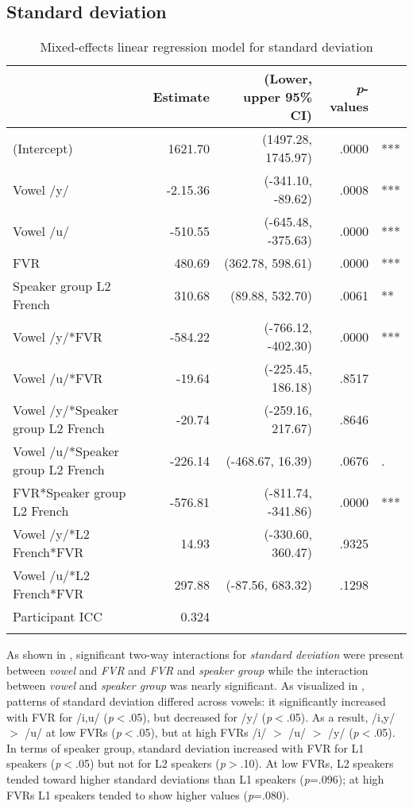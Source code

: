 \documentclass[output=paper,colorlinks,citecolor=brown,draftmode]{langscibook}
\begin{document}
\subsection{Standard deviation}
\begin{table}
\caption{Mixed-effects linear regression model for standard deviation}
\small
\begin{tabularx}{\textwidth}{Qrrrl}
 \lsptoprule
   & \textbf{Estimate} & \textbf{(Lower, upper 95\% CI)} & \textbf{\emph{p}-values} &  \\ [0.5ex]
 \midrule
 (Intercept) & 1621.70 & (1497.28, 1745.97) & .0000 & *** \\
 Vowel /y/ & -2.15.36 & (-341.10, -89.62) & .0008 & *** \\
 Vowel /u/ & -510.55 & (-645.48, -375.63) & .0000 & *** \\
 FVR & 480.69 & (362.78, 598.61) & .0000 & *** \\
 Speaker group L2 French & 310.68 & (89.88, 532.70) & .0061 & ** \\
 Vowel /y/*FVR & -584.22 & (-766.12, -402.30) & .0000 & *** \\
 Vowel /u/*FVR & -19.64 & (-225.45, 186.18) & .8517 & \\
 Vowel /y/*Speaker group L2 French & -20.74 & (-259.16, 217.67) & .8646 & \\
 Vowel /u/*Speaker group L2 French & -226.14 & (-468.67, 16.39) & .0676 & . \\
 FVR*Speaker group L2 French & -576.81 & (-811.74, -341.86) & .0000 & *** \\
 Vowel /y/*L2 French*FVR & 14.93 & (-330.60, 360.47) & .9325 & \\
 Vowel /u/*L2 French*FVR & 297.88 & (-87.56, 683.32) & .1298 & \\
\midrule
 Participant ICC & 0.324 & \\
\lspbottomrule
\end{tabularx}
\label{table:3}
\end{table}

As shown in , significant two-way interactions for \emph{standard deviation} were present between \emph{vowel} and \emph{FVR} and \emph{FVR} and \emph{speaker group} while the interaction between \emph{vowel} and \emph{speaker group} was nearly significant. As visualized in , patterns of standard deviation differed across vowels: it significantly increased with FVR for /i,u/ (\emph{p}$<$.05), but decreased for /y/ (\emph{p}$<$.05). As a result, /i,y/ $>$ /u/ at low FVRs (\emph{p}$<$.05), but at high FVRs /i/ $>$ /u/ $>$ /y/ (\emph{p}$<$.05).  In terms of speaker group, standard deviation increased with FVR for L1 speakers (\emph{p}$<$.05) but not for L2 speakers (\emph{p}$>$.10). At low FVRs, L2 speakers tended toward higher standard deviations than L1 speakers (\emph{p}=.096); at high FVRs L1 speakers tended to show higher values (\emph{p}=.080).
\end{document}
